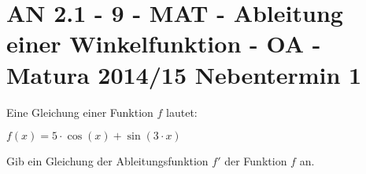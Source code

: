 \section{AN 2.1 - 9 - MAT - Ableitung einer Winkelfunktion - OA - Matura 2014/15 Nebentermin 1}

\begin{beispiel}[AN 2.1]{1} %
Eine Gleichung einer Funktion $f$ lautet:

$f(x)=5\cdot \cos(x)+\sin(3\cdot x)$ \leer

Gib ein Gleichung der Ableitungsfunktion $f'$ der Funktion $f$ an.

\end{beispiel}